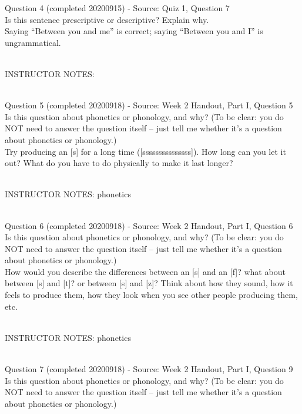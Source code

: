 \documentclass[12pt]{article}
\begin{document}
{\large Question 4} (completed 20200915) - Source: Quiz 1, Question 7\\

Is this sentence prescriptive or descriptive? Explain why.\\

Saying ``Between you and me'' is correct; saying ``Between you and I'' is ungrammatical.


~\\
INSTRUCTOR NOTES: 


~\\

{\large Question 5} (completed 20200918) - Source: Week 2 Handout, Part I, Question 5\\

Is this question about phonetics or phonology, and why? (To be clear: you do NOT need to answer the question itself -- just tell me whether it's a question about phonetics or phonology.)\\

Try producing an {[s]} for a long time ({[sssssssssssssss]}). How long can you let it out? What do you have to do physically to make it last longer?


~\\
INSTRUCTOR NOTES: phonetics


~\\

{\large Question 6} (completed 20200918) - Source: Week 2 Handout, Part I, Question 6\\

Is this question about phonetics or phonology, and why? (To be clear: you do NOT need to answer the question itself -- just tell me whether it's a question about phonetics or phonology.)\\

How would you describe the differences between an {[s]} and an {[f]}? what about between {[s]} and {[t]}? or between {[s]} and {[z]}? Think about how they sound, how it feels to produce them, how they look when you see other people producing them, etc.


~\\
INSTRUCTOR NOTES: phonetics


~\\

{\large Question 7} (completed 20200918) - Source: Week 2 Handout, Part I, Question 9\\

Is this question about phonetics or phonology, and why? (To be clear: you do NOT need to answer the question itself -- just tell me whether it's a question about phonetics or phonology.)\\
\end{document}
